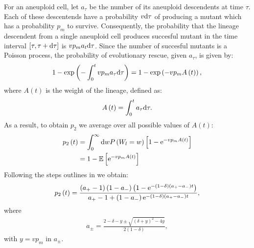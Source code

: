 \documentclass[12pt]{extarticle}
\renewcommand{\d}{{\rm d}}
\newcommand{\e}{{\rm e}}
\begin{document}
For an aneuploid cell, let $a_\tau$ be the number of its aneuploid descendents at time $\tau$. Each of these descentends have a probability $v\d \tau$ of producing a mutant which has a probability $p_m$ to survive. Consequently, the probability that the lineage descendent from a single aneuploid cell produces succesful mutant in the time interval $\left[\tau,\tau+\d \tau\right]$ is $vp_ma_t\d \tau$. Since the number of succesful mutants is a Poisson process, the probability of evolutionary rescue, given $a_\tau$, is given by:
\begin{align}
1-\exp\left(-\int_0^t vp_ma_\tau\d \tau\right)=1-\exp\left(-vp_mA\left(t\right)\right),
\end{align}
where $A\left(t\right)$ is the weight of the lineage, defined as:
\begin{equation}
A\left(t\right)=\int_0^t a_\tau\d \tau.
\end{equation}
As a result, to obtain $p_2$ we average over all possible values of $A\left(t\right)$:
\begin{align}
p_2\left(t\right)&=\int_0^\infty \d w P\left(W_l=w\right)\left[1-\e^{-vp_mA\left(t\right)}\right]\\
&=1-\mathbb{E}\left[\e^{-vp_mA\left(t\right)}\right]
\end{align}
Following the steps outlines in \cite{weissman2009rate} we obtain:
\begin{align}
p_2\left(t\right)=\frac{\left(a_+-1\right)\left(1-a_-\right)\left(1-\e^{-\left(1-\delta\right)\left(a_+-a_-\right)t}\right)}{a_+-1+\left(1-a_-\right)\e^{-\left(1-\delta\right)\left(a_+-a_-\right)t}},
\end{align}
where
\begin{align}
a_\pm=\frac{2-\delta-y\pm\sqrt{\left(\delta+y\right)^2-4y}}{2\left(1-\delta\right)},
\end{align}
with $y=vp_m$ in $a_\pm$.
\end{document}
